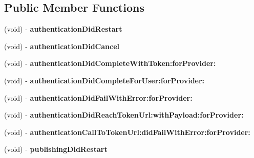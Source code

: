 \subsection*{Public Member Functions}
\begin{DoxyCompactItemize}
\item 
\hypertarget{protocol_j_r_session_delegate-p_a5da58216b4e8bd53bdcbc05dc35eeb45}{
(void) -\/ {\bfseries authenticationDidRestart}}
\label{protocol_j_r_session_delegate-p_a5da58216b4e8bd53bdcbc05dc35eeb45}

\item 
\hypertarget{protocol_j_r_session_delegate-p_a5d15a92c5d735285185ef6c8fc46f6e0}{
(void) -\/ {\bfseries authenticationDidCancel}}
\label{protocol_j_r_session_delegate-p_a5d15a92c5d735285185ef6c8fc46f6e0}

\item 
\hypertarget{protocol_j_r_session_delegate-p_aee2836d6ce529ea7b166664ab9a30b5b}{
(void) -\/ {\bfseries authenticationDidCompleteWithToken:forProvider:}}
\label{protocol_j_r_session_delegate-p_aee2836d6ce529ea7b166664ab9a30b5b}

\item 
\hypertarget{protocol_j_r_session_delegate-p_aa6e0e46951f0da265d078dc5cd6ae072}{
(void) -\/ {\bfseries authenticationDidCompleteForUser:forProvider:}}
\label{protocol_j_r_session_delegate-p_aa6e0e46951f0da265d078dc5cd6ae072}

\item 
\hypertarget{protocol_j_r_session_delegate-p_ab3796fb5b3b66307d1336e1c6fffd601}{
(void) -\/ {\bfseries authenticationDidFailWithError:forProvider:}}
\label{protocol_j_r_session_delegate-p_ab3796fb5b3b66307d1336e1c6fffd601}

\item 
\hypertarget{protocol_j_r_session_delegate-p_a37c170444c636c463059beb0d10873b1}{
(void) -\/ {\bfseries authenticationDidReachTokenUrl:withPayload:forProvider:}}
\label{protocol_j_r_session_delegate-p_a37c170444c636c463059beb0d10873b1}

\item 
\hypertarget{protocol_j_r_session_delegate-p_a5599d992d122c0aa87a3649bcc57c79d}{
(void) -\/ {\bfseries authenticationCallToTokenUrl:didFailWithError:forProvider:}}
\label{protocol_j_r_session_delegate-p_a5599d992d122c0aa87a3649bcc57c79d}

\item 
\hypertarget{protocol_j_r_session_delegate-p_a46a710e9d8441854007c8e1efb269c80}{
(void) -\/ {\bfseries publishingDidRestart}}
\label{protocol_j_r_session_delegate-p_a46a710e9d8441854007c8e1efb269c80}


\end{DoxyCompactItemize}
